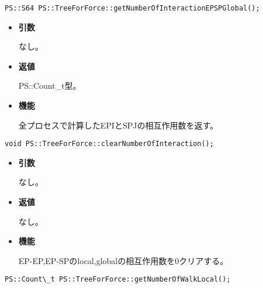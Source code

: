\begin{screen}
\begin{verbatim}
PS::S64 PS::TreeForForce::getNumberOfInteractionEPSPGlobal();
\end{verbatim}
\end{screen}

\begin{itemize}

\item {\bf 引数}

なし。

\item {\bf 返値}

PS::Count\_t型。

\item {\bf 機能}

全プロセスで計算したEPIとSPJの相互作用数を返す。

\end{itemize}

\begin{screen}
\begin{verbatim}
void PS::TreeForForce::clearNumberOfInteraction();
\end{verbatim}
\end{screen}

\begin{itemize}

\item {\bf 引数}

なし。

\item {\bf 返値}

なし。

\item {\bf 機能}

EP-EP,EP-SPのlocal,globalの相互作用数を0クリアする。

\end{itemize}

\begin{screen}
\begin{verbatim}
PS::Count\_t PS::TreeForForce::getNumberOfWalkLocal();
\end{verbatim}
\end{screen}

